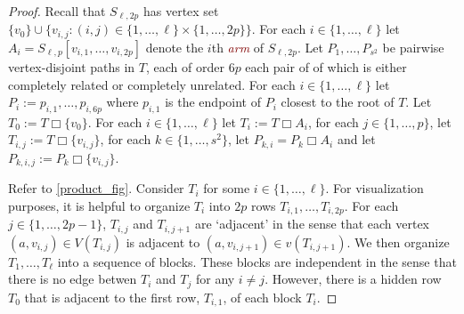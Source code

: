 \documentclass[kpfonts,lotsofwhite]{patmorin}
\newcommand{\defn}[1]{\textcolor{Maroon}{\emph{#1}}}
\newcommand{\boxprod}{\mathbin{\Box}}
\theoremstyle{plain}
\theoremstyle{definition}
\begin{document}
\begin{proof}
  Recall that $S_{\ell,2p}$ has vertex set $\{v_0\}\cup\{v_{i,j}:(i,j)\in \{1,\ldots,\ell\}\times\{1,\ldots,2p\}\}$. For each $i\in\{1,\ldots,\ell\}$ let $A_i=S_{\ell,p}[v_{i,1},\ldots,v_{i,2p}]$ denote the $i$th \defn{arm} of $S_{\ell,2p}$.  Let $P_1,\ldots,P_{s^2}$ be pairwise vertex-disjoint paths in $T$, each of order $6p$ each pair of of which is either completely related or completely unrelated.  For each $i\in\{1,\ldots,\ell\}$ let $P_i:= p_{i,1},\ldots,p_{i,6p}$ where $p_{i,1}$ is the endpoint of $P_i$ closest to the root of $T$.  Let $T_0:=T\boxprod \{v_0\}$.  For each $i\in\{1,\ldots,\ell\}$ let $T_i:=T\boxprod A_i$, for each $j\in \{1,\ldots,p\}$, let $T_{i,j}:=T\boxprod \{v_{i,j}\}$, for each $k\in\{1,\ldots,s^2\}$, let $P_{k,i}=P_k\boxprod A_i$ and let $P_{k,i,j}:=P_k\boxprod \{v_{i,j}\}$.

  Refer to \cref{product_fig}.
  Consider $T_i$ for some $i\in\{1,\ldots,\ell\}$. For visualization purposes, it is helpful to organize $T_i$ into $2p$ rows $T_{i,1},\ldots,T_{i,2p}$.  For each $j\in\{1,\ldots,2p-1\}$, $T_{i,j}$ and $T_{i,j+1}$ are `adjacent' in the sense that each vertex $(a,v_{i,j})\in V(T_{i,j})$ is adjacent to $(a,v_{i,j+1})\in v(T_{i,j+1})$.  We then organize $T_1,\ldots,T_{\ell}$ into a sequence of blocks. These blocks are independent in the sense that there is no edge betwen $T_{i}$ and $T_j$ for any $i\neq j$.  However, there is a hidden row $T_0$ that is adjacent to the first row, $T_{i,1}$, of each block $T_i$.


\end{proof}
\end{document}

